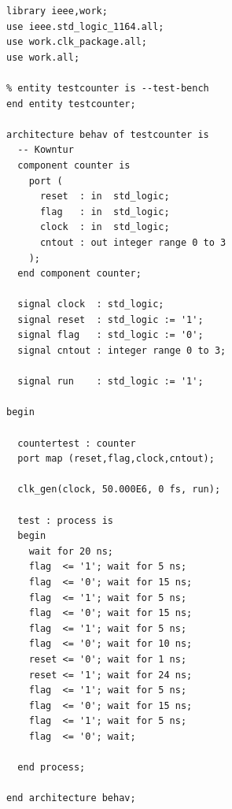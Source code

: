 \documentclass[11pt]{report}
\begin{document}
\begin{spacing}{1.5}
\vspace{15px}
\begin{lstlisting}
library ieee,work;
use ieee.std_logic_1164.all;
use work.clk_package.all;
use work.all;

% entity testcounter is --test-bench
end entity testcounter;

architecture behav of testcounter is
  -- Kowntur
  component counter is
    port (
      reset  : in  std_logic;
      flag   : in  std_logic;
      clock  : in  std_logic;
      cntout : out integer range 0 to 3
    );
  end component counter;

  signal clock  : std_logic;
  signal reset  : std_logic := '1';
  signal flag   : std_logic := '0';
  signal cntout : integer range 0 to 3;

  signal run    : std_logic := '1';

begin

  countertest : counter
  port map (reset,flag,clock,cntout);

  clk_gen(clock, 50.000E6, 0 fs, run);

  test : process is
  begin
    wait for 20 ns;
    flag  <= '1'; wait for 5 ns;
    flag  <= '0'; wait for 15 ns;
    flag  <= '1'; wait for 5 ns;
    flag  <= '0'; wait for 15 ns;
    flag  <= '1'; wait for 5 ns;
    flag  <= '0'; wait for 10 ns;
    reset <= '0'; wait for 1 ns;
    reset <= '1'; wait for 24 ns;
    flag  <= '1'; wait for 5 ns;
    flag  <= '0'; wait for 15 ns;
    flag  <= '1'; wait for 5 ns;
    flag  <= '0'; wait;

  end process;

end architecture behav;
\end{lstlisting}


\end{spacing}
\end{document}
